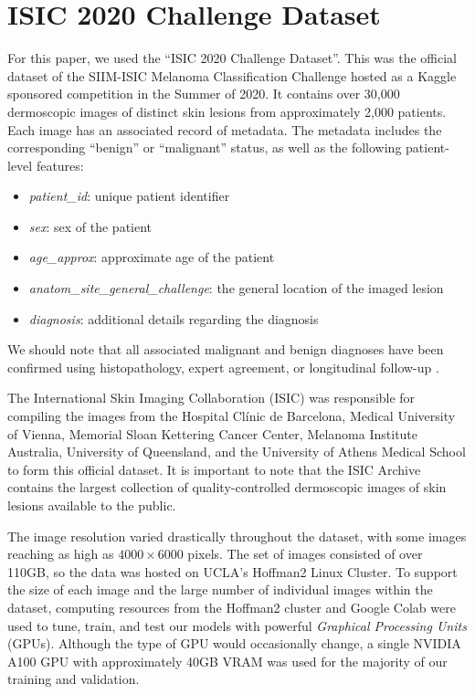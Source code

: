 \documentclass [MAS] {uclathes}
\begin{document}
\section{ISIC 2020 Challenge Dataset}

For this paper, we used the ``ISIC 2020 Challenge Dataset''. This was the official dataset of the SIIM-ISIC Melanoma Classification Challenge hosted as a Kaggle sponsored competition in the Summer of 2020. It contains over 30,000 dermoscopic images of distinct skin lesions from approximately 2,000 patients. Each image has an associated record of metadata. The metadata includes the corresponding ``benign'' or ``malignant'' status, as well as the following patient-level features: 

\begin{itemize}
    \item \textit{patient\_id}: unique patient identifier
    \item \textit{sex}: sex of the patient 
    \item \textit{age\_approx}: approximate age of the patient
    \item \textit{anatom\_site\_general\_challenge}: the general location of the imaged lesion
    \item \textit{diagnosis}: additional details regarding the diagnosis
\end{itemize}

We should note that all associated malignant and benign diagnoses have been confirmed using histopathology, expert agreement, or longitudinal follow-up \cite{ISIC}.

The International Skin Imaging Collaboration (ISIC) was responsible for compiling the images from the Hospital Clínic de Barcelona, Medical University of Vienna, Memorial Sloan Kettering Cancer Center, Melanoma Institute Australia, University of Queensland, and the University of Athens Medical School to form this official dataset. It is important to note that the ISIC Archive contains the largest collection of quality-controlled dermoscopic images of skin lesions available to the public. 

The image resolution varied drastically throughout the dataset, with some images reaching as high as $4000 \times 6000$ pixels. The set of images consisted of over 110GB, so the data was hosted on UCLA's Hoffman2 Linux Cluster. To support the size of each image and the large number of individual images within the dataset, computing resources from the Hoffman2 cluster and Google Colab were used to tune, train, and test our models with powerful \textit{Graphical Processing Units} (GPUs). Although the type of GPU would occasionally change, a single NVIDIA A100 GPU with approximately 40GB VRAM was used for the majority of our training and validation.
\end{document}
